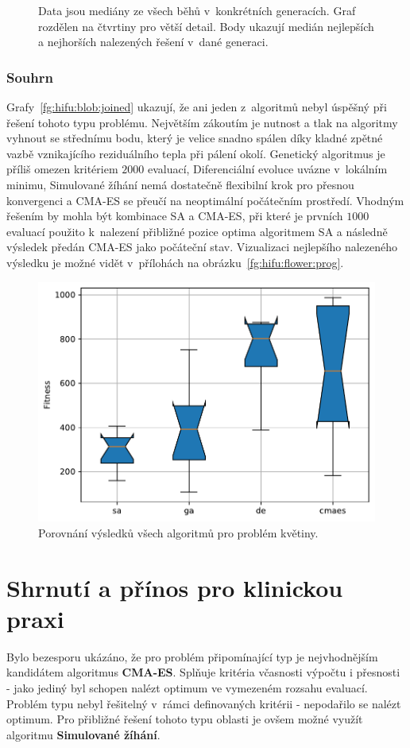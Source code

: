 \begin{figure}[H]
{\begin{tabular}{cc}
    \end{tabular}
    }
    \caption{Data jsou mediány ze všech běhů v~konkrétních generacích. Graf rozdělen na čtvrtiny pro větší detail. Body ukazují medián nejlepších a nejhorších nalezených řešení v~dané generaci.}
    \label{fg:hifu:flower:cmaes:evoProg}
\end{figure}

\subsubsection{Souhrn}
Grafy~\ref{fg:hifu:blob:joined} ukazují, že ani jeden z~algoritmů nebyl úspěšný při řešení tohoto typu problému. Největším zákoutím je nutnost a tlak na algoritmy vyhnout se střednímu bodu, který je velice snadno spálen díky kladné zpětné vazbě vznikajícího reziduálního tepla při pálení okolí. Genetický algoritmus je příliš omezen kritériem $2000$ evaluací, Diferenciální evoluce uvázne v~lokálním minimu, Simulované žíhání nemá dostatečně flexibilní krok pro přesnou konvergenci a CMA-ES se přeučí na neoptimální počátečním prostředí. Vhodným řešením by mohla být kombinace SA a CMA-ES, při které je prvních $1000$ evaluací použito k~nalezení přibližné pozice optima algoritmem SA a následně výsledek předán CMA-ES jako počáteční stav.
Vizualizaci nejlepšího nalezeného výsledku je možné vidět v~přílohách na obrázku~\ref{fg:hifu:flower:prog}.

\begin{figure}[H]
    \centering
	\includegraphics[width=0.6\linewidth]{obrazky-figures/statistics/HIFU/flower/15/JOINED/solutionsPlotsComparasion.pdf}

    \caption{Porovnání výsledků všech algoritmů pro problém květiny.}
    \label{fg:hifu:flower:joined}
\end{figure}


\section{Shrnutí a přínos pro klinickou praxi}
Bylo bezesporu ukázáno, že pro problém připomínající typ  je nejvhodnějším kandidátem algoritmus \textbf{CMA-ES}. Splňuje kritéria včasnosti výpočtu i přesnosti - jako jediný byl schopen nalézt optimum ve vymezeném rozsahu evaluací. Problém typu  nebyl řešitelný v~rámci definovaných kritérii - nepodařilo se nalézt optimum. Pro přibližné řešení tohoto typu oblasti je ovšem možné využít algoritmu \textbf{Simulované žíhání}.

